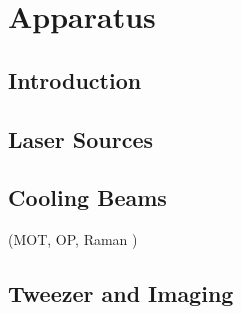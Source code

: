
\chapter{Apparatus}
\label{ch:apparatus}

\section{Introduction}
\label{ch:apparatus:introduction}

\section{Laser Sources}
\label{ch:apparatus:laser}

\section{Cooling Beams}
\label{ch:apparatus:cooling}

(MOT, OP, Raman )

\section{Tweezer and Imaging}
\label{ch:apparatus:tweezer}
